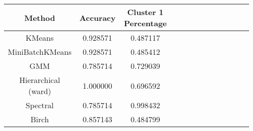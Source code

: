 \begin{tabular}{ccccccccccccc}
\toprule
             Method &  Accuracy &  Cluster 1 Percentage \\
\midrule
             KMeans &  0.928571 &              0.487117 \\
    MiniBatchKMeans &  0.928571 &              0.485412 \\
                GMM &  0.785714 &              0.729039 \\
Hierarchical (ward) &  1.000000 &              0.696592 \\
           Spectral &  0.785714 &              0.998432 \\
              Birch &  0.857143 &              0.484799 \\
\bottomrule
\end{tabular}

